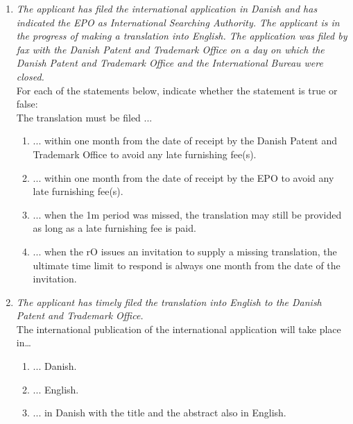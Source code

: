 \documentclass{report}
\begin{document}
\begin{enumerate}[label=\textbf{Question \arabic*}]
\begin{enumerate}[label=(\alph*)]
        \item \textit{The applicant has filed the international application in Danish and has indicated the EPO as International Searching Authority. The applicant is in the progress of making a translation into English. The application was filed by fax with the Danish Patent and Trademark Office on a day on which the Danish Patent and Trademark Office and the International Bureau were closed.} \\
        For each of the statements below, indicate whether the statement is true or false: \\
        The translation must be filed ...
        \begin{enumerate}[label={(\alph{enumi}.\arabic*)}]
            \item ... within one month from the date of receipt by the Danish Patent and Trademark Office to avoid any late furnishing fee(s).
            \item ... within one month from the date of receipt by the EPO to avoid any late furnishing fee(s).
            \item ... when the 1m period was missed, the translation may still be provided as long as a late furnishing fee is paid.
            \item ... when the rO issues an invitation to supply a missing translation, the ultimate time limit to respond is always one month from the date of the invitation.
        \end{enumerate}
        
        \item \textit{The applicant has timely filed the translation into English to the Danish Patent and Trademark Office.} \\
        The international publication of the international application will take place in…
        \begin{enumerate}[label={(\alph{enumi}.\arabic*)}]
            \item ... Danish.
            \item ... English.
            \item ... in Danish with the title and the abstract also in English.
        \end{enumerate}
    \end{enumerate}


\end{enumerate}
\end{document}
